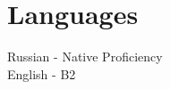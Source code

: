 \documentclass[a4paper,10pt]{article}
\begin{document}
\begin{adjustbox}{valign=t}
\begin{minipage}[t]{0.3\textwidth}
\vspace{-0.2cm}

\section*{Languages}
Russian - Native Proficiency\\
English - B2

\vspace{0.5cm}
\begin{center}
\end{center}

\end{minipage}
\end{adjustbox}
%
\hfill
\begin{adjustbox}{valign=t}
\begin{minipage}{0.05\textwidth}
\MyVerticalRule
\end{minipage}
\end{adjustbox}
\hfill
%
\end{document}
